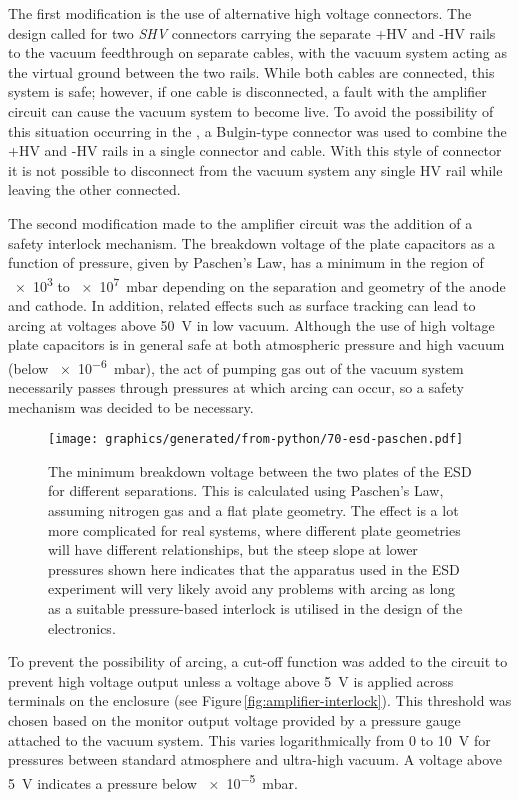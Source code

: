 The first modification is the use of alternative high voltage connectors. The \AEIPROTOTYPE{} design called for two \emph{SHV} connectors carrying the separate +\gls{HV} and -\gls{HV} rails to the vacuum feedthrough on separate cables, with the vacuum system acting as the virtual ground between the two rails. While both cables are connected, this system is safe; however, if one cable is disconnected, a fault with the amplifier circuit can cause the vacuum system to become live. To avoid the possibility of this situation occurring in the \SSM{}, a Bulgin-type connector was used to combine the +\gls{HV} and -\gls{HV} rails in a single connector and cable. With this style of connector it is not possible to disconnect from the vacuum system any single \gls{HV} rail while leaving the other connected.

The second modification made to the amplifier circuit was the addition of a safety interlock mechanism. The breakdown voltage of the plate capacitors as a function of pressure, given by Paschen's Law, has a minimum in the region of \SI{e3}{} to \SI{e7}{\milli\bar} depending on the separation and geometry of the anode and cathode. In addition, related effects such as surface tracking can lead to arcing at voltages above \SI{50}{\volt} in low vacuum. Although the use of high voltage plate capacitors is in general safe at both atmospheric pressure and high vacuum (below \SI{e-6}{\milli\bar}), the act of pumping gas out of the vacuum system necessarily passes through pressures at which arcing can occur, so a safety mechanism was decided to be necessary.

\begin{figure}
  \centering
  \texttt{[image: graphics/generated/from-python/70-esd-paschen.pdf]}
  \caption{The minimum breakdown voltage between the two plates of the \gls{ESD} for different separations. This is calculated using Paschen's Law, assuming nitrogen gas and a flat plate geometry. The effect is a lot more complicated for real systems, where different plate geometries will have different relationships, but the steep slope at lower pressures shown here indicates that the apparatus used in the \gls{ESD} experiment will very likely avoid any problems with arcing as long as a suitable pressure-based interlock is utilised in the design of the electronics.}
  \label{fig:esd-paschen}
\end{figure}

To prevent the possibility of arcing, a cut-off function was added to the circuit to prevent high voltage output unless a voltage above \SI{5}{\volt} is applied across terminals on the enclosure (see Figure\,\ref{fig:amplifier-interlock}). This threshold was chosen based on the monitor output voltage provided by a pressure gauge attached to the vacuum system. This varies logarithmically from \SI{0}{} to \SI{10}{\volt} for pressures between standard atmosphere and ultra-high vacuum. A voltage above \SI{5}{\volt} indicates a pressure below \SI{e-5}{\milli\bar}.

